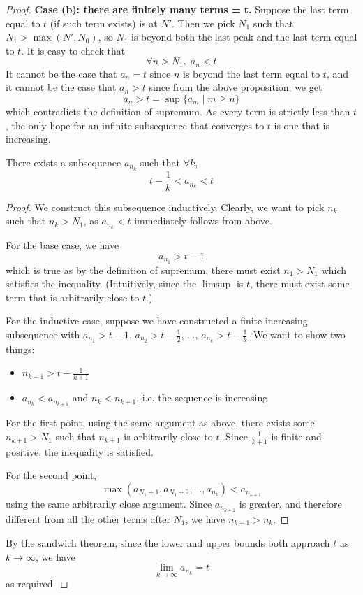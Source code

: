 \begin{proof}
  \textbf{Case (b): there are finitely many terms = t.} Suppose the last term equal to $t$ (if such term exists) is at $N'$. Then we pick $N_1$ such that $N_1 > \max(N', N_0)$, so $N_1$ is beyond both the last peak and the last term equal to $t$. It is easy to check that
  \[
    \forall n > N_1,\; a_n < t
  \]
  It cannot be the case that $a_n = t$ since $n$ is beyond the last term equal to $t$, and it cannot be the case that $a_n > t$ since from the above proposition, we get
  \[
    a_n > t = \sup\{a_m \;|\; m \geq n \}
  \]
  which contradicts the definition of supremum. As every term is strictly less than $t$, the only hope for an infinite subsequence that converges to $t$ is one that is increasing.
  \begin{prop}
    There exists a subsequence $a_{n_k}$ such that $\forall k$,
    \[
      t - \frac{1}{k} < a_{n_k} < t
    \]
  \end{prop}
  \begin{proof}
    We construct this subsequence inductively. Clearly, we want to pick $n_k$ such that $n_k > N_1$, as $a_{n_k} < t$ immediately follows from above.

    For the base case, we have
    \[
      a_{n_1} > t - 1
    \]
    which is true as by the definition of supremum, there must exist $n_1 > N_1$ which satisfies the inequality. (Intuitively, since the $\limsup$ is $t$, there must exist some term that is arbitrarily close to $t$.)

    For the inductive case, suppose we have constructed a finite increasing subsequence with $a_{n_1} > t - 1$, $a_{n_2} > t - \frac{1}{2}$, ..., $a_{n_k} > t - \frac{1}{k}$. We want to show two things:
    \begin{itemize}
      \item $n_{k + 1} > t - \frac{1}{k + 1}$
      \item $a_{n_k} < a_{n_{k + 1}}$ and $n_k < n_{k + 1}$, i.e. the sequence is increasing
    \end{itemize}
    For the first point, using the same argument as above, there exists some $n_{k + 1} > N_1$ such that $n_{k + 1}$ is arbitrarily close to $t$. Since $\frac{1}{k + 1}$ is finite and positive, the inequality is satisfied.

    For the second point,
    \[
      \max(a_{N_1 + 1}, a_{N_1 + 2}, ..., a_{n_k}) < a_{n_{k + 1}}
    \]
    using the same arbitrarily close argument. Since $a_{n_{k + 1}}$ is greater, and therefore different from all the other terms after $N_1$, we have $n_{k + 1} > n_k$.
  \end{proof}
  By the sandwich theorem, since the lower and upper bounds both approach $t$ as $k \to \infty$, we have
  \[
    \lim_{k \to \infty} a_{n_k} = t
  \]
  as required.
\end{proof}
